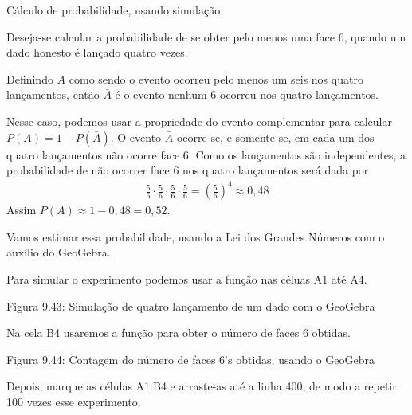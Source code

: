 \begin{example}{Cálculo de probabilidade, usando simulação}

Deseja-se calcular a probabilidade de se obter pelo menos uma face 6, quando um dado honesto é lançado quatro vezes.

Definindo \(A\) como sendo o evento ocorreu pelo menos um seis nos quatro lançamentos, então \(\bar{A}\) é o evento nenhum 6 ocorreu nos quatro lançamentos.

Nesse caso, podemos usar a propriedade do evento complementar para calcular \(P(A)=1-P(\bar{A})\).
O evento \(\bar{A}\)  ocorre se, e somente se, em cada um dos quatro lançamentos não ocorre face 6. Como os lançamentos são independentes, a probabilidade de não ocorrer face 6 nos quatro lançamentos será dada por
\begin{equation*}
\begin{split}\frac{5}{6}\cdot \frac{5}{6}\cdot \frac{5}{6}\cdot \frac{5}{6}=\left (\frac{5}{6}\right )^4\approx 0,48\end{split}
\end{equation*}
Assim \(P(A) \approx 1- 0,48=0,52\).

Vamos estimar essa probabilidade, usando a Lei dos Grandes Números com o auxílio do GeoGebra.

Para simular o experimento podemos usar a função  nas céluas A1 até A4.
\label{\detokenize{PE511-A:id7}}
\begin{figure}[H]
\centering

\noindent{}
\label{\detokenize{PE511-A:id7}}\end{figure}

Figura 9.43: Simulação de quatro lançamento de um dado com o GeoGebra

Na cela B4 usaremos a função  para obter o número de faces 6 obtidas.
\label{\detokenize{PE511-A:id8}}
\begin{figure}[H]
\centering

\noindent{}
\label{\detokenize{PE511-A:id8}}\end{figure}

Figura 9.44: Contagem do número de faces 6’s obtidas, usando o GeoGebra

Depois, marque as células A1:B4 e arraste-as até a linha 400, de modo a repetir 100 vezes esse experimento.
\label{\detokenize{PE511-A:id9}}
\begin{figure}[H]
\centering


\end{figure}
\end{example}
